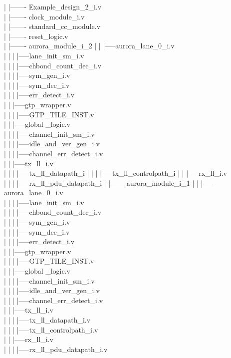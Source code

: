 \begin{appendix}
	|		|------- Example\_design\_2\_i.v \\
	|       	|------- clock\_module\_i.v \\
	|		|------- standard\_cc\_module.v \\
	|		|------- reset\_logic.v \\
	|		|------- aurora\_module\_i\_2
	|		|		|-----aurora\_lane\_0\_i.v \\
	|		|		|		|-----lane\_init\_sm\_i.v \\
	|		|		|		|-----chbond\_count\_dec\_i.v \\
	|		|		|		|-----sym\_gen\_i.v \\
	|		|		|		|-----sym\_dec\_i.v \\
	|		|		|		|-----err\_detect\_i.v \\
	|		|		|-----gtp\_wrapper.v \\
	|		|		|		|-----GTP\_TILE\_INST.v \\
	|		|		|-----global \_logic.v \\
	|		|		|		|-----channel\_init\_sm\_i.v \\
	|		|		|		|-----idle\_and\_ver\_gen\_i.v \\
	|		|		|		|-----channel\_err\_detect\_i.v \\
	|		|		|-----tx\_ll\_i.v \\
	|		|		|		|-----tx\_ll\_datapath\_i
	|		|		|		|-----tx\_ll\_controlpath\_i
	|		|		|-----rx\_ll\_i.v \\
	|		|		|		|-----rx\_ll\_pdu\_datapath\_i
	|		|-------aurora\_module\_i\_1
	|		|		|-----aurora\_lane\_0\_i.v \\
	|		|		|		|-----lane\_init\_sm\_i.v \\
	|		|		|		|-----chbond\_count\_dec\_i.v \\
	|		|		|		|-----sym\_gen\_i.v \\
	|		|		|		|-----sym\_dec\_i.v \\
	|		|		|		|-----err\_detect\_i.v \\
	|		|		|-----gtp\_wrapper.v \\
	|		|		|		|-----GTP\_TILE\_INST.v \\
	|		|		|-----global \_logic.v \\
	|		|		|		|-----channel\_init\_sm\_i.v \\
	|		|		|		|-----idle\_and\_ver\_gen\_i.v \\
	|		|		|		|-----channel\_err\_detect\_i.v \\
	|		|		|-----tx\_ll\_i.v \\
	|		|		|		|-----tx\_ll\_datapath\_i.v \\
	|		|		|		|-----tx\_ll\_controlpath\_i.v \\
	|		|		|-----rx\_ll\_i.v \\
	|		|		|		|-----rx\_ll\_pdu\_datapath\_i.v \\
	

\end{appendix}
